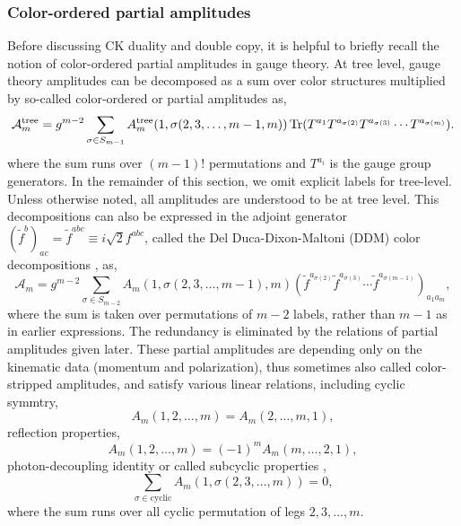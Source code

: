 \documentclass[a4paper,11pt]{article}
\begin{document}
\subsubsection{Color-ordered partial amplitudes}
Before discussing CK duality and double copy, it is helpful to briefly recall the notion of color-ordered partial amplitudes in gauge theory. 
At tree level, gauge theory amplitudes can be decomposed as a sum over color structures multiplied by so-called color-ordered or partial amplitudes as,
\begin{equation}\label{DDM}
    \mathcal{A}_m^{\text{tree}}=g^{m-2}\sum_{\sigma \in S_{m-1}}A_m^{\text{tree}}(1,\sigma(2,3,\dots,m-1,m))\Tr(T^{a_1}T^{a_{\sigma(2)}}T^{a_{\sigma(3)}}\cdots T^{a_{\sigma(m)}}).
\end{equation}
where the sum runs over $(m-1)!$ permutations and $T^{a_i}$ is the gauge group generators. In the remainder of this section, we omit explicit labels for tree-level. Unless otherwise noted, all amplitudes are understood to be at tree level. 
This decompositions can also be expressed in the adjoint generator $(\tilde{f}^{b})_{ac}=\tilde{f}^{abc}\equiv i\sqrt{2}f^{abc}$, called the Del Duca-Dixon-Maltoni (DDM) color decompositions \cite{DelDuca:1999rs}, as,
\begin{equation}
    \mathcal{A}_m=g^{m-2}\sum_{\sigma \in S_{m-2}}A_m(1,\sigma(2,3,\dots,m-1),m)(\tilde{f}^{a_{\sigma(2)}}\tilde{f}^{a_{\sigma(3)}}\cdots \tilde{f}^{a_{\sigma(m-1)}})_{a_1a_m},
\end{equation}
where the sum is taken over permutations of $m-2$ labels, rather than $m-1$ as in earlier expressions. The redundancy is eliminated by the relations of partial amplitudes given later. 
These partial amplitudes are depending only on the kinematic data (momentum and polarization), thus sometimes also called color-stripped amplitudes, and satisfy various linear relations, including cyclic symmtry,
\begin{equation}\label{cyclic}
    A_m(1,2,\dots,m)=A_m(2,\dots,m,1),
\end{equation}
reflection properties,
\begin{equation}
    A_m(1,2,\dots,m)=(-1)^m A_m(m,\dots,2,1),
\end{equation}
photon-decoupling identity or called subcyclic properties \cite{Dixon:1996wi,Mangano:1990by},
\begin{equation}
    \sum_{\sigma\in \mathrm{cyclic}}A_m(1,\sigma(2,3,\dots,m))=0,
\end{equation}
where the sum runs over all cyclic permutation of legs $2,3,\dots,m$.
\end{document}
